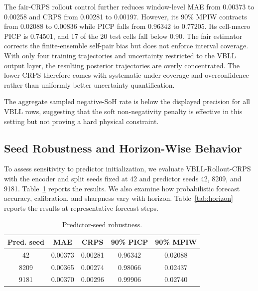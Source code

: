 \documentclass[conference]{IEEEtran}
\begin{document}
The fair-CRPS rollout control further reduces window-level MAE from 0.00373 to
0.00258 and CRPS from 0.00281 to 0.00197. However, its 90\% MPIW contracts from
0.02088 to 0.00836 while PICP falls from 0.96342 to 0.77205. Its cell-macro
PICP is 0.74501, and 17 of the 20 test cells fall below 0.90. The fair estimator
corrects the finite-ensemble self-pair bias but does not enforce interval
coverage. With only four training trajectories and uncertainty restricted to
the VBLL output layer, the resulting posterior trajectories are overly
concentrated. The lower CRPS therefore comes with systematic under-coverage
and overconfidence rather than uniformly better uncertainty quantification.

The aggregate sampled negative-SoH rate is below the displayed precision for
all VBLL rows, suggesting that the soft non-negativity penalty is effective in
this setting but not proving a hard physical constraint.

\subsection{Seed Robustness and Horizon-Wise Behavior}

To assess sensitivity to predictor initialization, we evaluate
VBLL-Rollout-CRPS with the encoder and split seeds fixed at 42 and predictor
seeds 42, 8209, and 9181. Table~\ref{tab:seed-robustness} reports the results.
We also examine how probabilistic forecast accuracy, calibration, and
sharpness vary with horizon. Table~\ref{tab:horizon} reports the results at
representative forecast steps.

\begin{table}[t]
\centering
\scriptsize
\caption{Predictor-seed robustness.}
\label{tab:seed-robustness}
\setlength{\tabcolsep}{2pt}
\begin{tabular}{@{}ccccc@{}}
\toprule
Pred. seed & MAE & CRPS & 90\% PICP & 90\% MPIW \\
\midrule
42 & 0.00373 & 0.00281 & 0.96342 & 0.02088 \\
8209 & 0.00365 & 0.00274 & 0.98066 & 0.02437 \\
9181 & 0.00370 & 0.00296 & 0.99906 & 0.02740 \\
\bottomrule
\end{tabular}
\end{table}
\end{document}
